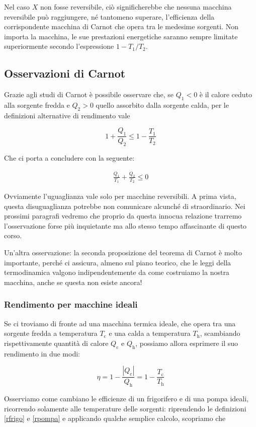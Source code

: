Nel caso $X$ non fosse reversibile, ciò significherebbe che
nessuna macchina reversibile può raggiungere, né tantomeno
superare, l'efficienza della corrispondente macchina di Carnot
che opera tra le medesime sorgenti. Non importa la macchina,
le sue prestazioni energetiche saranno sempre limitate superiormente
secondo l'espressione $1 - T_1/T_2$.

\subsection{Osservazioni di Carnot}
Grazie agli studi di Carnot è possibile osservare che, se $Q_1 < 0$ è il calore ceduto
alla sorgente fredda e $Q_2 > 0$ quello assorbito dalla sorgente
calda, per le definizioni alternative di rendimento vale

\[ 1 + \frac{Q_1}{Q_2} \leq 1 - \frac{T_1}{T_2} \]

\noindent Che ci porta a concludere con la seguente:

\begin{align}
    \frac{Q_1}{T_1} + \frac{Q_2}{T_2} \leq 0
\end{align}

\noindent Ovviamente l'uguaglianza vale solo per macchine reversibili.
A prima vista, questa disuguaglianza potrebbe non comunicare
alcunché di straordinario. Nei prossimi paragrafi vedremo che
proprio da questa innocua relazione trarremo l'osservazione
forse più inquietante ma allo stesso tempo affascinante di
questo corso.

Un'altra osservazione: la seconda proposizione del teorema di Carnot
è molto importante, perché ci assicura, almeno sul piano teorico, che
le leggi della termodinamica valgono indipendentemente da come costruiamo
la nostra macchina, anche se questa non esiste ancora!

\subsubsection{Rendimento per macchine ideali}
Se ci troviamo di fronte ad una macchina termica ideale, che opera tra
una sorgente fredda a temperatura $T_\text{c}$ e una calda a
temperatura $T_\text{h}$, scambiando rispettivamente quantità di
calore $Q_\text{c}$ e $Q_\text{h}$, possiamo allora
esprimere il suo rendimento in due modi:

\[ \eta = 1 - \frac{|Q_\text{c}|}{Q_\text{h}} = 1 - \frac{T_\text{c}}{T_\text{h}} \]

\noindent Osserviamo come cambiano le efficienze di un frigorifero
e di una pompa ideali, ricorrendo solamente alle temperature delle
sorgenti: riprendendo le definizioni \ref{rfrigo} e \ref{rpompa} e
applicando qualche semplice calcolo, scopriamo che

